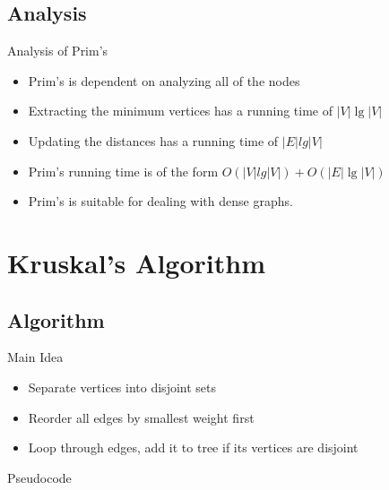 \documentclass{beamer}
\begin{document}
\subsection{Analysis}
\begin{frame}{Analysis of Prim's}
    \begin{itemize}
    \item Prim's is dependent on analyzing all of the nodes
    \item Extracting the minimum vertices has a running time of $|V|\lg|V|$
    \item Updating the distances has a running time of $|E|lg|V|$ 
    \item Prim's running time is of the form $O(|V|lg|V|) + O(|E|\lg|V|)$
    \item Prim's is suitable for dealing with dense graphs.
    \end{itemize}
\end{frame}


\section{Kruskal's Algorithm}\frame{\sectionpage}
\subsection{Algorithm}
\begin{frame}{Main Idea}
    \begin{itemize}
    \item Separate vertices into disjoint sets
    \item Reorder all edges by smallest weight first
    \item Loop through edges, add it to tree if its vertices are disjoint
    \end{itemize}
\end{frame}


\begin{frame}{Pseudocode}
\vkruskal
\end{frame}
\end{document}

